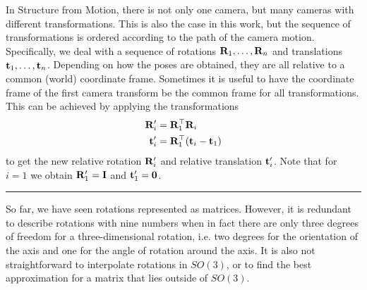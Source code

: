		In Structure from Motion, there is not only one camera, but many cameras with different transformations.
		This is also the case in this work, but the sequence of transformations is ordered according to the path of the camera motion. 
		Specifically, we deal with a sequence of rotations $\mathbf{R}_1, \dots, \mathbf{R}_n$ and translations $\mathbf{t}_1, \dots, \mathbf{t}_n$. 
		Depending on how the poses are obtained, they are all relative to a common (world) coordinate frame.
		Sometimes it is useful to have the coordinate frame of the first camera transform be the common frame for all transformations.
		This can be achieved by applying the transformations
		\begin{align}\label{eq:relative_rotation_conversion}
			\begin{split}
				\mathbf{R}_{i}^\prime 	&= \mathbf{R}_{1}^{\top} \mathbf{R}_{i} \\
				\mathbf{t}_{i}^\prime 	&= \mathbf{R}_{1}^{\top} (\mathbf{t}_i - \mathbf{t}_1)
			\end{split}
		\end{align}
		to get the new relative rotation $\mathbf{R}_{i}^\prime$ and relative translation $\mathbf{t}_{i}^\prime$.
		Note that for $i = 1$ we obtain $\mathbf{R}_{1}^\prime = \mathbf{I}$ and $\mathbf{t}_{1}^\prime = \mathbf{0}$.
		
		\noindent\rule{2cm}{0.4pt}
		
		So far, we have seen rotations represented as matrices. 
		However, it is redundant to describe rotations with nine numbers when in fact there are only three degrees of freedom for a three-dimensional rotation, i.e. two degrees for the orientation of the axis and one for the angle of rotation around the axis.
		It is also not straightforward to interpolate rotations in $SO(3)$, or to find the best approximation for a matrix that lies outside of $SO(3)$.
		
